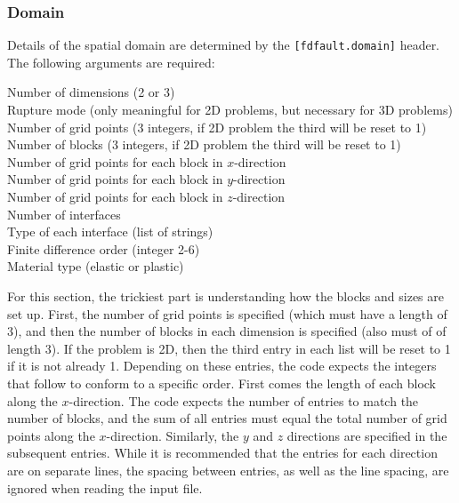 \documentclass[12pt]{article}   	%
\begin{document}
\subsubsection{Domain}

Details of the spatial domain are determined by the {\tt [fdfault.domain]} header. The following arguments are required:

\vspace{0.1in}
Number of dimensions (2 or 3) \\
\indent Rupture mode (only meaningful for 2D problems, but necessary for 3D problems) \\
\indent Number of grid points (3 integers, if 2D problem the third will be reset to 1) \\
\indent Number of blocks (3 integers, if 2D problem the third will be reset to 1) \\
\indent Number of grid points for each block in $x$-direction \\
\indent Number of grid points for each block in $y$-direction \\
\indent Number of grid points for each block in $z$-direction \\
\indent Number of interfaces \\
\indent Type of each interface (list of strings)\\
\indent Finite difference order (integer 2-6)\\
\indent Material type (elastic or plastic)

\vspace{0.1in}
\noindent For this section, the trickiest part is understanding how the blocks and sizes are set up. First, the number of grid points is specified (which must have a length of 3), and then the number of blocks in each dimension is specified (also must of of length 3). If the problem is 2D, then the third entry in each list will be reset to 1 if it is not already 1. Depending on these entries, the code expects the integers that follow to conform to a specific order. First comes the length of each block along the $x$-direction. The code expects the number of entries to match the number of blocks, and the sum of all entries must equal the total number of grid points along the $x$-direction. Similarly, the $y$ and $z$ directions are specified in the subsequent entries. While it is recommended that the entries for each direction are on separate lines, the spacing between entries, as well as the line spacing, are ignored when reading the input file.
\end{document}

